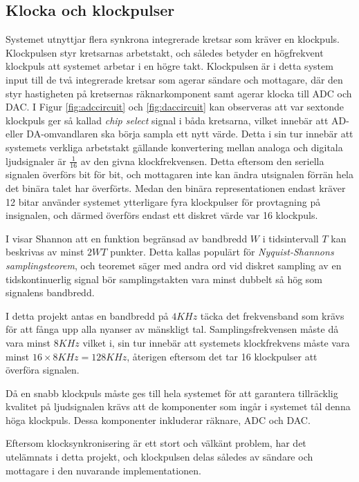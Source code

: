 \documentclass[a4paper,10pt]{article}
\begin{document}
\subsection{Klocka och klockpulser}

Systemet utnyttjar flera synkrona integrerade kretsar som kräver en
klockpuls. Klockpulsen styr kretsarnas arbetstakt, och således betyder en 
högfrekvent klockpuls att systemet arbetar i en högre takt. Klockpulsen är i 
detta system input till de två integrerade kretsar som agerar sändare och 
mottagare, där den styr hastigheten på kretsernas räknarkomponent samt agerar 
klocka till ADC och DAC. I Figur 
\ref{fig:adccircuit} och \ref{fig:daccircuit} kan observeras att var sextonde 
klockpuls ger så kallad \textit{chip select} signal i båda kretsarna, vilket 
innebär att AD- eller DA-omvandlaren ska börja sampla ett nytt värde. Detta i 
sin tur innebär att systemets verkliga arbetstakt gällande konvertering mellan 
analoga och digitala ljudsignaler är $\frac{1}{16}$ av den givna 
klockfrekvensen. Detta eftersom den seriella signalen överförs bit för bit, 
och mottagaren inte kan ändra utsignalen förrän hela det binära talet har 
överförts. Medan den binära representationen endast kräver 12 bitar använder 
systemet ytterligare fyra klockpulser för provtagning på insignalen, och därmed 
överförs endast ett diskret värde var 16 klockpuls.

I \cite{sampling} visar Shannon att en funktion begränsad av bandbredd $W$ i tidsintervall $T$ kan beskrivas av minst $2WT$ punkter. Detta kallas populärt för \textit{Nyquist-Shannons samplingsteorem}, och teoremet säger med andra ord vid diskret sampling av en tidskontinuerlig signal bör samplingstakten vara minst dubbelt så hög som signalens bandbredd.

I detta projekt antas en bandbredd på $4KHz$ täcka det frekvensband som krävs för att 
fånga upp alla nyanser av mänskligt tal. Samplingsfrekvensen måste då vara 
minst $8KHz$ vilket i, sin tur innebär att systemets klockfrekvens måste vara 
minst $16 \times 8KHz = 128KHz$, återigen eftersom det tar 16 klockpulser att
överföra signalen.

Då en snabb klockpuls måste ges till hela systemet för att garantera tillräcklig 
kvalitet på ljudsignalen krävs att de komponenter som ingår i systemet tål denna 
höga klockpuls. Dessa komponenter inkluderar räknare, ADC och DAC.

Eftersom klocksynkronisering är ett stort och välkänt problem, har det 
utelämnats i detta projekt, och klockpulsen delas således av sändare och 
mottagare i den nuvarande implementationen. 
\end{document}
